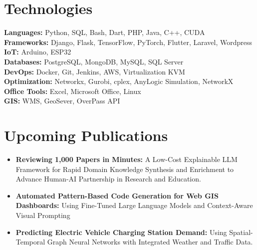 \documentclass[10pt, letterpaper]{article}
\begin{document}
\section*{Technologies}
\small
\begin{multicols}{2}
    \textbf{Languages:} Python, SQL, Bash, Dart, PHP, Java, C++, CUDA \\
    \textbf{Frameworks:} Django, Flask, TensorFlow, PyTorch, Flutter, Laravel, Wordpress \\
    \textbf{IoT:} Arduino, ESP32 \\
    \textbf{Databases:} PostgreSQL, MongoDB, MySQL, SQL Server \\
    \textbf{DevOps:} Docker, Git, Jenkins, AWS, Virtualization KVM \\
    \textbf{Optimization:} Networkx, Gurobi, cplex, AnyLogic Simulation, NetworkX \\
    \textbf{Office Tools:} Excel, Microsoft Office, Linux \\
    \textbf{GIS:} WMS, GeoSever, OverPass API \\
\end{multicols}



\section*{Upcoming Publications}
\small
\begin{itemize}[left=0pt]
    \item \textbf{Reviewing 1,000 Papers in Minutes:} A Low-Cost Explainable LLM Framework for Rapid Domain Knowledge Synthesis and Enrichment to Advance Human-AI Partnership in Research and Education.
    \item \textbf{Automated Pattern-Based Code Generation for Web GIS Dashboards:} Using Fine-Tuned Large Language Models and Context-Aware Visual Prompting 
    \item \textbf{Predicting Electric Vehicle Charging Station Demand:} Using Spatial-Temporal Graph Neural Networks with Integrated Weather and Traffic Data.
\end{itemize}




 


    
\end{document}
